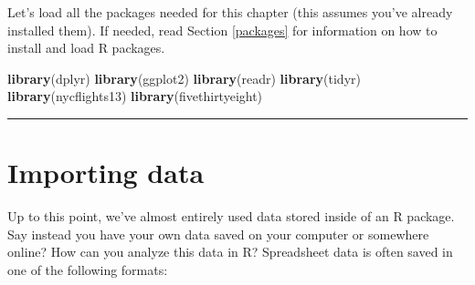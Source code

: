 \documentclass[12pt, krantz2,]{krantz}
\makeatletter
\newenvironment{Shaded}{\begin{snugshade}}{\end{snugshade}}
\newcommand{\KeywordTok}[1]{\textcolor[rgb]{0.27,0.27,0.27}{\textbf{#1}}}
\newcommand{\NormalTok}[1]{#1}
\newenvironment{kframe}{%
\medskip{}
\setlength{\fboxsep}{.8em}
 \def\at@end@of@kframe{}%
 \ifinner\ifhmode%
  \def\at@end@of@kframe{\end{minipage}}%
  \begin{minipage}{\columnwidth}%
 \fi\fi%
 \def\FrameCommand##1{\hskip\@totalleftmargin \hskip-\fboxsep
 \colorbox{shadecolor}{##1}\hskip-\fboxsep
     \hskip-\linewidth \hskip-\@totalleftmargin \hskip\columnwidth}%
 \MakeFramed {\advance\hsize-\width
   \@totalleftmargin\z@ \linewidth\hsize
   \@setminipage}}%
 {\par\unskip\endMakeFramed%
 \at@end@of@kframe}
\renewenvironment{Shaded}{\begin{kframe}}{\end{kframe}}
\makeatother
\begin{document}
Let's load all the packages needed for this chapter (this assumes you've already installed them). If needed, read Section \ref{packages} for information on how to install and load R packages.

\begin{Shaded}
\begin{Highlighting}[]
\KeywordTok{library}\NormalTok{(dplyr)}
\KeywordTok{library}\NormalTok{(ggplot2)}
\KeywordTok{library}\NormalTok{(readr)}
\KeywordTok{library}\NormalTok{(tidyr)}
\KeywordTok{library}\NormalTok{(nycflights13)}
\KeywordTok{library}\NormalTok{(fivethirtyeight)}
\end{Highlighting}
\end{Shaded}

\begin{center}\rule{0.5\linewidth}{\linethickness}\end{center}

\hypertarget{csv}{%
\section{Importing data}\label{csv}}

Up to this point, we've almost entirely used data stored inside of an R package. Say instead you have your own data saved on your computer or somewhere online? How can you analyze this data in R? Spreadsheet data is often saved in one of the following formats:
\end{document}
